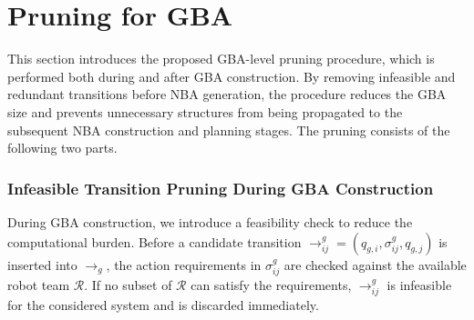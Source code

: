 \documentclass[lettersize,journal]{IEEEtran}
\theoremstyle{italiclemma}
\theoremstyle{italiclemma}
\theoremstyle{definition}
\begin{document}
\section{Pruning for GBA} \label{sec:gba_pruning}

This section introduces the proposed GBA-level pruning procedure, which is performed both during and after GBA construction. By removing infeasible and redundant transitions before NBA generation, the procedure reduces the GBA size and prevents unnecessary structures from being propagated to the subsequent NBA construction and planning stages. The pruning consists of the following two parts.

\subsubsection{Infeasible Transition Pruning During GBA Construction}  \label{subsec:infeasible_gba_pruning}
During GBA construction, we introduce a feasibility check to reduce the computational burden.
Before a candidate transition $\rightarrow^g_{ij}=(q_{g,i},\sigma^g_{ij},q_{g,j})$
is inserted into \(\rightarrow_g\), the action requirements in
\(\sigma^g_{ij}\) are checked against the available robot team \(\mathcal{R}\). If no subset of \(\mathcal{R}\) can satisfy the  requirements, \(\rightarrow^g_{ij}\) is infeasible for the considered system and is discarded immediately.
\end{document}
